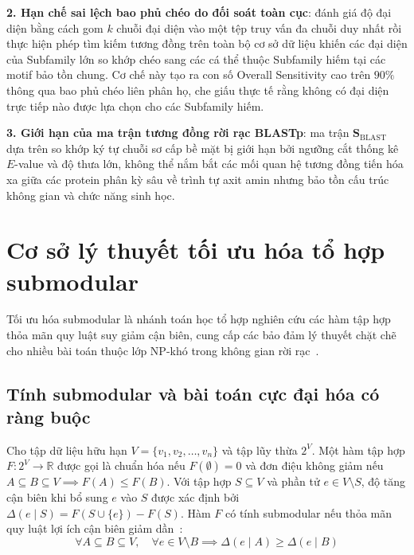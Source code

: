 \textbf{2. Hạn chế sai lệch bao phủ chéo do đối soát toàn cục}: đánh giá độ đại diện bằng cách gom $k$ chuỗi đại diện vào một tệp truy vấn đa chuỗi duy nhất rồi thực hiện phép tìm kiếm tương đồng trên toàn bộ cơ sở dữ liệu khiến các đại diện của Subfamily lớn so khớp chéo sang các cá thể thuộc Subfamily hiếm tại các motif bảo tồn chung. Cơ chế này tạo ra con số Overall Sensitivity cao trên $90\%$ thông qua bao phủ chéo liên phân họ, che giấu thực tế rằng không có đại diện trực tiếp nào được lựa chọn cho các Subfamily hiếm.

\textbf{3. Giới hạn của ma trận tương đồng rời rạc BLASTp}: ma trận $\mathbf{S}_{\text{BLAST}}$ dựa trên so khớp ký tự chuỗi sơ cấp bề mặt bị giới hạn bởi ngưỡng cắt thống kê $E$-value và độ thưa lớn, không thể nắm bắt các mối quan hệ tương đồng tiến hóa xa giữa các protein phân kỳ sâu về trình tự axit amin nhưng bảo tồn cấu trúc không gian và chức năng sinh học.

\section{Cơ sở lý thuyết tối ưu hóa tổ hợp submodular}
\label{sec:theory_submodular}

Tối ưu hóa submodular là nhánh toán học tổ hợp nghiên cứu các hàm tập hợp thỏa mãn quy luật suy giảm cận biên, cung cấp các bảo đảm lý thuyết chặt chẽ cho nhiều bài toán thuộc lớp NP-khó trong không gian rời rạc~\cite{krause2014}.

\subsection{Tính submodular và bài toán cực đại hóa có ràng buộc}
\label{subsec:submodularity_and_problem}

Cho tập dữ liệu hữu hạn $V = \{v_1, v_2, \dots, v_n\}$ và tập lũy thừa $2^V$. Một hàm tập hợp $F: 2^V \to \mathbb{R}$ được gọi là chuẩn hóa nếu $F(\emptyset) = 0$ và đơn điệu không giảm nếu $A \subseteq B \subseteq V \implies F(A) \le F(B)$. Với tập hợp $S \subseteq V$ và phần tử $e \in V \setminus S$, độ tăng cận biên khi bổ sung $e$ vào $S$ được xác định bởi $\Delta(e \mid S) = F(S \cup \{e\}) - F(S)$. Hàm $F$ có tính submodular nếu thỏa mãn quy luật lợi ích cận biên giảm dần~\cite{krause2014}:
\begin{equation}
\label{eq:submodularity_def}
\forall A \subseteq B \subseteq V, \quad \forall e \in V \setminus B \implies \Delta(e \mid A) \ge \Delta(e \mid B)
\end{equation}

